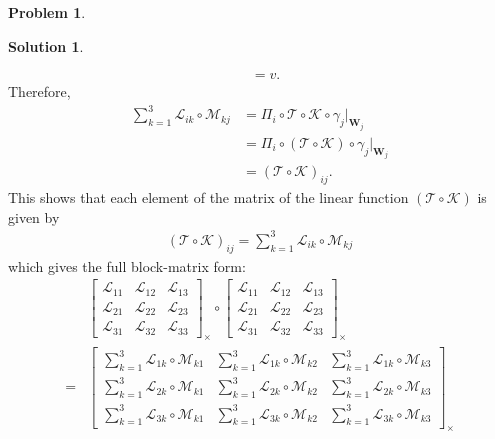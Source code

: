 \documentclass{book}
\theoremstyle{definition}
\newtheorem*{prob*}{Problem}
\newtheorem*{sln*}{Solution}
\newcommand{\W}{\mathbf{W}}
\newcommand{\lag}{\mathcal{L}}
\newcommand{\M}{\mathcal{M}}
\newcommand{\K}{\mathcal{K}}
\newcommand{\T}{\mathcal{T}}
\begin{document}
\begin{prob*}
\begin{sln*}
\begin{enumerate}
\begin{enumerate}
\begin{align*}
			&= v.
			\end{align*}
			Therefore,
			\begin{align*}
			\sum^3_{k=1} \lag_{ik} \circ \M_{kj} 
			&= \Pi_i \circ \T \circ \K \circ \gamma_j\bigg\vert_{\W_j}\\
			&= \Pi_i \circ \left(\T \circ \K\right) \circ \gamma_j\bigg\vert_{\W_j}\\
			&= (\T \circ \K)_{ij}.
			\end{align*}
			This shows that each element of the matrix of the linear function $(\T\circ \K)$ is given by
			\begin{align*}
			\boxed{(\T\circ\K)_{ij} = \sum^3_{k=1} \lag_{ik} \circ \M_{kj}}
			\end{align*}
			which gives the full block-matrix form:
			\begin{align*}
			&\begin{bmatrix}
			\lag_{11} & \lag_{12} & \lag_{13}\\
			\lag_{21} & \lag_{22} & \lag_{23}\\
			\lag_{31} & \lag_{32} & \lag_{33} 
			\end{bmatrix}_\times
			\circ 
			\begin{bmatrix}
			\lag_{11} & \lag_{12} & \lag_{13}\\
			\lag_{21} & \lag_{22} & \lag_{23}\\
			\lag_{31} & \lag_{32} & \lag_{33} 
			\end{bmatrix}_\times\\
			=
			&\begin{bmatrix}
			\sum^3_{k=1} \lag_{1k} \circ \M_{k1} &
			\sum^3_{k=1} \lag_{1k} \circ \M_{k2} &
			\sum^3_{k=1} \lag_{1k} \circ \M_{k3} \\
			\sum^3_{k=1} \lag_{2k} \circ \M_{k1} &
			\sum^3_{k=1} \lag_{2k} \circ \M_{k2} &
			\sum^3_{k=1} \lag_{2k} \circ \M_{k3} \\
			\sum^3_{k=1} \lag_{3k} \circ \M_{k1} &
			\sum^3_{k=1} \lag_{3k} \circ \M_{k2} &
			\sum^3_{k=1} \lag_{3k} \circ \M_{k3} 
			\end{bmatrix}_\times
			\end{align*}
			
			\end{enumerate}
			
			
			
			
			
			\newpage
			
		\end{enumerate}
			 
			
	\end{sln*}
	
	
\end{prob*}
\end{document}
